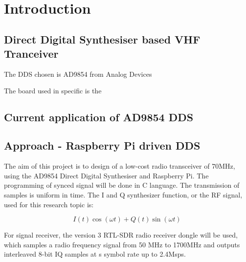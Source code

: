 \chapter{Introduction}
\vspace{-1.4em}


\section{Direct Digital Synthesiser based VHF Tranceiver}

The DDS chosen is AD9854 from Analog Devices

The board used in specific is the 



\section{Current application of AD9854 DDS}




\section{Approach - Raspberry Pi driven DDS}

The aim of this project is to design of a low-cost radio transceiver of 70MHz, using the AD9854 Direct Digital Synthesiser and Raspberry Pi. The programming of synced signal will be done in C language. The transmission of samples is uniform in time.
The I and Q synthesizer function, or the RF signal, used for this research topic is: 

\begin{equation}
I(t)\cos(\omega t)+Q(t)\sin(\omega t)
\end{equation}

For signal receiver, the version 3 RTL-SDR radio receiver dongle will be used, which samples a radio frequency signal from 50 MHz to 1700MHz and outputs interleaved 8-bit IQ samples at s symbol rate up to 2.4Msps.




